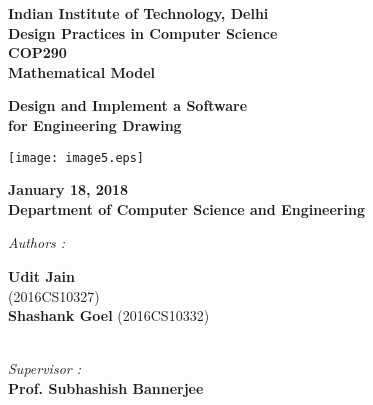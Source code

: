 \documentclass[12pt]{report}
\begin{document}
\begin{center}
\LARGE{\textbf{Indian Institute of Technology, Delhi}}\\
\vspace{1cm}
\large{\textbf{Design Practices in Computer Science}}\\[5pt]
\large{\textbf{COP290}}\\[5pt]
\large{\textbf{Mathematical Model}}\\[5pt]
\vspace{0.5cm}

\large{\textbf{Design and Implement a Software }}
\large{\textbf{\\for Engineering Drawing}}\\[5pt]




\begin{center}
\texttt{[image: image5.eps]}
\end{center}
\vspace{0.2cm}

\textbf{January 18, 2018} \\
\textbf{Department of Computer Science and Engineering} \\


\vspace{2cm}


\begin{multicols*}{2}

\begin{flushleft}

\textit{Authors :\\ }


\textbf{Udit Jain} \\
(2016CS10327)\\
\textbf{Shashank Goel}
(2016CS10332)\\

\end{flushleft}


\columnbreak

\begin{flushleft}

\textit{\\Supervisor :\\ }
\textbf{Prof. Subhashish Bannerjee} \\[5pt]

\end{flushleft}

\end{multicols*}

\end{center}
\end{document}
